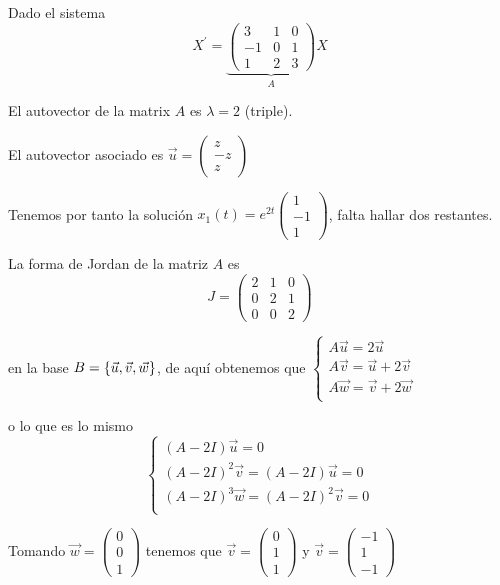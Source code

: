 \documentclass{mathnotes}
\begin{document}
\begin{example}
Dado el sistema $$X^\prime = \underbrace{\begin{pmatrix}
3 & 1 & 0\\-1 & 0 & 1\\1 & 2 & 3
\end{pmatrix}}_AX$$

El autovector de la matrix $A$ es $\lambda = 2$ (triple). 

El autovector asociado es $\vec{u} = \begin{pmatrix}
z\\-z\\z
\end{pmatrix}$

Tenemos por tanto la solución $x_1(t) = e^{2t}\begin{pmatrix}
1\\ -1\\ 1
\end{pmatrix}$, falta hallar dos restantes.

La forma de Jordan de la matriz $A$ es $$J = \begin{pmatrix}
2& 1& 0\\ 0& 2& 1\\ 0& 0& 2
\end{pmatrix}$$

en la base $B = \{ \vec{u}, \vec{v}, \vec{w} \}$, de aquí obtenemos que $\left\lbrace
  \begin{array}{l}
     A\vec{u} = 2\vec{u}\\
     A\vec{v} = \vec{u} + 2\vec{v}\\
     A\vec{w} = \vec{v} + 2\vec{w}\\
  \end{array}
  \right.
$ 

o lo que es lo mismo $$\left\lbrace
  \begin{array}{l}
     (A-2I)\vec{u} = 0\\
     (A-2I)^2\vec{v} = (A-2I)\vec{u} = 0\\
     (A-2I)^3\vec{w} = (A-2I)^2\vec{v} = 0\\
  \end{array}
  \right.$$
  
Tomando $\vec{w} = \begin{pmatrix}
0\\0\\1
\end{pmatrix}$ tenemos que $\vec{v} = \begin{pmatrix}
0\\1\\1
\end{pmatrix}$ y $\vec{v} = \begin{pmatrix}
-1\\1\\-1
\end{pmatrix}$


\end{example}
\end{document}
